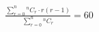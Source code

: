 \documentclass[preview]{standalone}
\begin{document}
\begin{align*}
\frac{\sum_{r=0}^n {}^nC_r \cdot r(r-1)}{\sum_{r=0}^n {}^nC_r} = 60
\end{align*}
\end{document}

